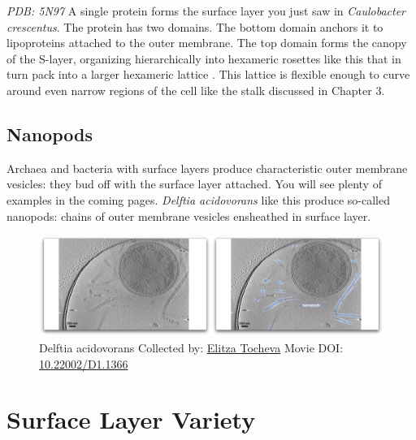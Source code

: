 \documentclass[]{tufte-book}
\begin{document}
\emph{PDB: 5N97} A single protein forms the surface layer you just saw
in \emph{Caulobacter crescentus}. The protein has two domains. The
bottom domain anchors it to lipoproteins attached to the outer membrane.
The top domain forms the canopy of the S-layer, organizing
hierarchically into hexameric rosettes like this that in turn pack into
a larger hexameric lattice \citep{bharat2017}. This lattice is flexible
enough to curve around even narrow regions of the cell like the stalk
discussed in Chapter 3.

\hypertarget{Nanopods}{\subsection{Nanopods}\label{Nanopods}}

Archaea and bacteria with surface layers produce characteristic outer
membrane vesicles: they bud off with the surface layer attached. You
will see plenty of examples in the coming pages. \emph{Delftia
acidovorans} like this produce so-called nanopods: chains of outer
membrane vesicles ensheathed in surface layer.





\begin{figure}
\includegraphics{movie_stills/2_6a} \caption[Delftia acidovorans Collected by:
\protect\hyperlink{elitza_tocheva}{Elitza Tocheva} Movie DOI:
\href{https://doi.org/10.22002/D1.1366}{10.22002/D1.1366}]{Delftia acidovorans Collected by:
\protect\hyperlink{elitza_tocheva}{Elitza Tocheva} Movie DOI:
\href{https://doi.org/10.22002/D1.1366}{10.22002/D1.1366}}\label{fig:2-6a}
\end{figure}

\section{Surface Layer Variety}\label{surface-layer-variety}
\end{document}
